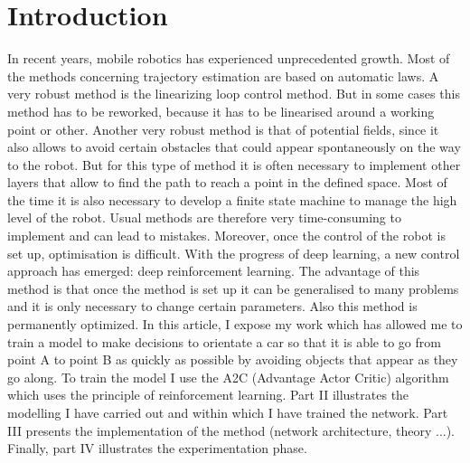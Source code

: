 \section{Introduction}
In recent years, mobile robotics has experienced unprecedented growth. Most of the methods concerning trajectory estimation are based on automatic laws.
A very robust method is the linearizing loop control method. But in some cases this method has to be reworked, because it has to be linearised around a working point or other. 
Another very robust method is that of potential fields, since it also allows to avoid certain obstacles that could appear spontaneously on the way to the robot. 
But for this type of method it is often necessary to implement other layers that allow to find the path to reach a point in the defined space. 
Most of the time it is also necessary to develop a finite state machine to manage the high level of the robot. 
Usual methods are therefore very time-consuming to implement and can lead to mistakes. Moreover, once the control of the robot is set up, optimisation is difficult.
With the progress of deep learning, a new control approach has emerged: deep reinforcement learning.
The advantage of this method is that once the method is set up it can be generalised to many problems and it is only necessary to change certain parameters. Also this method is permanently optimized.
In this article, I expose my work which has allowed me to train a model to make decisions to orientate a car so that it is able to go from point A to point B as quickly as possible by avoiding objects that appear as they go along.
To train the model I use the A2C (Advantage Actor Critic) algorithm which uses the principle of reinforcement learning.
Part II illustrates the modelling I have carried out and within which I have trained the network. Part III presents the implementation of the method (network architecture, theory ...).
Finally, part IV illustrates the experimentation phase.